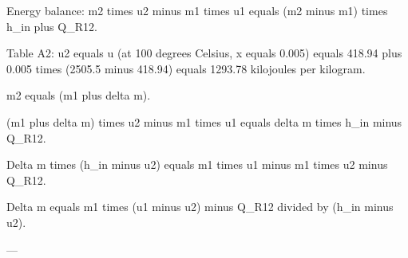 Energy balance:  
m2 times u2 minus m1 times u1 equals (m2 minus m1) times h_in plus Q_R12.  

Table A2:  
u2 equals u (at 100 degrees Celsius, x equals 0.005) equals 418.94 plus 0.005 times (2505.5 minus 418.94) equals 1293.78 kilojoules per kilogram.  

m2 equals (m1 plus delta m).  

(m1 plus delta m) times u2 minus m1 times u1 equals delta m times h_in minus Q_R12.  

Delta m times (h_in minus u2) equals m1 times u1 minus m1 times u2 minus Q_R12.  

Delta m equals m1 times (u1 minus u2) minus Q_R12 divided by (h_in minus u2).  

---